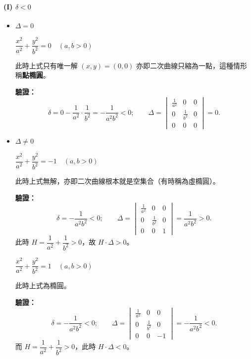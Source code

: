 \paragraph*{(I) $\delta < 0$}
\begin{itemize}
  \item[(i)] $\Delta = 0$
  \begin{example}
  $\dfrac{x^2}{a^2} + \dfrac{y^2}{b^2} = 0 \quad (a, b > 0)$
  
  此時上式只有唯一解 $(x, y) = (0, 0)$ 亦即二次曲線只縮為一點，這種情形稱\textbf{點橢圓}。
  
  \textbf{驗證：}
  \[
  \delta = 0 - \frac{1}{a^2} \cdot \frac{1}{b^2} = -\frac{1}{a^2 b^2} < 0; \qquad
  \Delta = \begin{vmatrix} \frac{1}{a^2} & 0 & 0 \\ 0 & \frac{1}{b^2} & 0 \\ 0 & 0 & 0 \end{vmatrix} = 0.
  \]
  \end{example}

  \item[(ii)] $\Delta \ne 0$
  \begin{example}
  $\dfrac{x^2}{a^2} + \dfrac{y^2}{b^2} = -1 \quad (a, b > 0)$
  
  此時上式無解，亦即二次曲線根本就是空集合（有時稱為虛橢圓）。
  
  \textbf{驗證：}
  \[
  \delta = -\frac{1}{a^2 b^2} < 0; \qquad
  \Delta = \begin{vmatrix} \frac{1}{a^2} & 0 & 0 \\ 0 & \frac{1}{b^2} & 0 \\ 0 & 0 & 1 \end{vmatrix} = \frac{1}{a^2 b^2} > 0.
  \]
  此時 $H = \dfrac{1}{a^2} + \dfrac{1}{b^2} > 0$，故 $H \cdot \Delta > 0$。
  \end{example}

  \begin{example}
  $\dfrac{x^2}{a^2} + \dfrac{y^2}{b^2} = 1 \quad (a, b > 0)$
  
  此時上式為橢圓。
  
  \textbf{驗證：}
  \[
  \delta = -\frac{1}{a^2 b^2} < 0; \qquad
  \Delta = \begin{vmatrix} \frac{1}{a^2} & 0 & 0 \\ 0 & \frac{1}{b^2} & 0 \\ 0 & 0 & -1 \end{vmatrix} = -\frac{1}{a^2 b^2} < 0.
  \]
  而 $H = \dfrac{1}{a^2} + \dfrac{1}{b^2} > 0$，此時 $H \cdot \Delta < 0$。
  \end{example}
\end{itemize}

